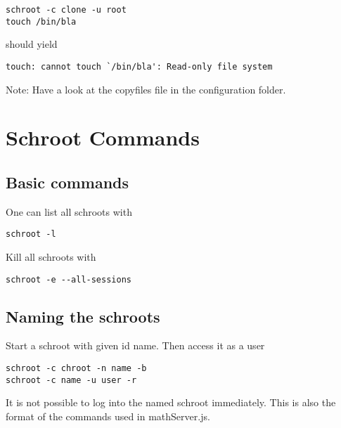 \documentclass[a4paper]{book}
\begin{document}
\begin{verbatim}
schroot -c clone -u root
touch /bin/bla
\end{verbatim}

should yield

\begin{verbatim}
touch: cannot touch `/bin/bla': Read-only file system
\end{verbatim}

Note: Have a look at the copyfiles file in the configuration folder.

\section{Schroot Commands}
\subsection{Basic commands}
One can list all schroots with

\begin{verbatim}
schroot -l
\end{verbatim}

Kill all schroots with

\begin{verbatim}
schroot -e --all-sessions
\end{verbatim}

\subsection{Naming the schroots}
Start a schroot with given id name. Then access it as a user

\begin{verbatim}
schroot -c chroot -n name -b
schroot -c name -u user -r
\end{verbatim}

It is not possible to log into the named schroot immediately.
This is also the format of the commands used in mathServer.js.
\end{document}
